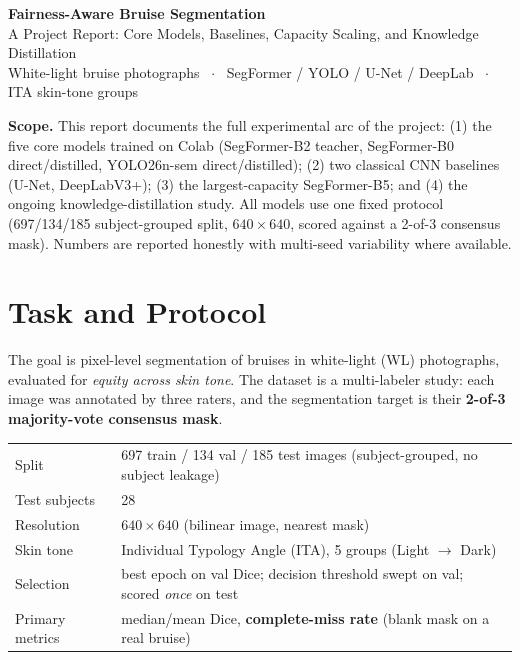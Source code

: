 \documentclass[11pt]{article}
\begin{document}
\begin{center}
  {\LARGE\bfseries Fairness-Aware Bruise Segmentation}\\[3pt]
  {\large A Project Report: Core Models, Baselines, Capacity Scaling, and Knowledge Distillation}\\[3pt]
  {\small White-light bruise photographs \, $\cdot$ \, SegFormer / YOLO / U-Net / DeepLab \, $\cdot$ \, ITA skin-tone groups}
\end{center}

\vspace{2pt}

\begin{keybox}
\textbf{Scope.} This report documents the full experimental arc of the project: (1) the five
core models trained on Colab (SegFormer-B2 teacher, SegFormer-B0 direct/distilled, YOLO26n-sem
direct/distilled); (2) two classical CNN baselines (U-Net, DeepLabV3+); (3) the largest-capacity
SegFormer-B5; and (4) the ongoing knowledge-distillation study. All models use one fixed protocol
(697/134/185 subject-grouped split, $640{\times}640$, scored against a 2-of-3 consensus mask).
Numbers are reported honestly with multi-seed variability where available.
\end{keybox}

\section{Task and Protocol}

The goal is pixel-level segmentation of bruises in white-light (WL) photographs, evaluated for
\emph{equity across skin tone}. The dataset is a multi-labeler study: each image was annotated by
three raters, and the segmentation target is their \textbf{2-of-3 majority-vote consensus mask}.

\begin{center}\small
\begin{tabular}{ll}
\toprule
Split & 697 train / 134 val / 185 test images (subject-grouped, no subject leakage) \\
Test subjects & 28 \\
Resolution & $640\times640$ (bilinear image, nearest mask) \\
Skin tone & Individual Typology Angle (ITA), 5 groups (Light $\to$ Dark) \\
Selection & best epoch on val Dice; decision threshold swept on val; scored \emph{once} on test \\
Primary metrics & median/mean Dice, \textbf{complete-miss rate} (blank mask on a real bruise) \\
\bottomrule
\end{tabular}
\end{center}
\end{document}
